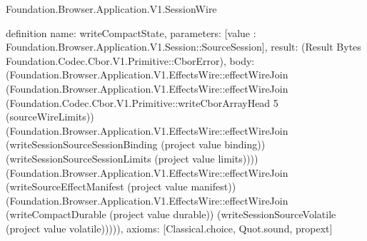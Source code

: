 \begin{lexlean}{Foundation.Browser.Application.V1.SessionWire}
\begin{semanticmodule}
definition{
  name: writeCompactState,
  parameters: [value : Foundation.Browser.Application.V1.Session::SourceSession],
  result: (Result Bytes Foundation.Codec.Cbor.V1.Primitive::CborError),
  body: (Foundation.Browser.Application.V1.EffectsWire::effectWireJoin (Foundation.Browser.Application.V1.EffectsWire::effectWireJoin (Foundation.Codec.Cbor.V1.Primitive::writeCborArrayHead 5 (sourceWireLimits)) (Foundation.Browser.Application.V1.EffectsWire::effectWireJoin (writeSessionSourceSessionBinding (project value binding)) (writeSessionSourceSessionLimits (project value limits)))) (Foundation.Browser.Application.V1.EffectsWire::effectWireJoin (writeSourceEffectManifest (project value manifest)) (Foundation.Browser.Application.V1.EffectsWire::effectWireJoin (writeCompactDurable (project value durable)) (writeSessionSourceVolatile (project value volatile))))),
  axioms: [Classical.choice, Quot.sound, propext]
}


\end{semanticmodule}
\end{lexlean}
